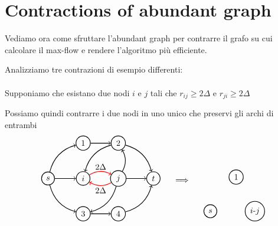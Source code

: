 \section{Contractions of abundant graph}
Vediamo ora come sfruttare l'abundant graph per contrarre il grafo su cui calcolare il max-flow e rendere l'algoritmo più efficiente.

Analizziamo tre contrazioni di esempio differenti:\\
\\
Supponiamo che esistano due nodi $i$ e $j$ tali che $r_{ij} \ge 2\Delta$ e $r_{ji} \ge 2\Delta$

Possiamo quindi contrarre i due nodi in uno unico che preservi gli archi di entrambi
\[\begin{tabular}{ccc}
    \begin{tikzpicture}[node distance={15mm}, thick , main/.style = {draw, circle}] 
    

    \node[main] (0) {$s$};
    \node[main] (3) [right of= 0 ] {$i$};
    \node[main] (4) [right of=3] {$j$};
    \node[main] (1) [below of = 3 ] {3};
    \node[main] (2) [above of = 3] {$1$};
    
    \node[main] (6) [above of=4] {$2$};
    \node[main] (5) [below of=4] {$4$};
    \node[main] (7) [right of=4] {$t$};
    \draw[->] (0) [bend right] to (1);
    \draw[->] (0) [bend left] to (2);
    \draw[->] (0) to (3);
    \draw[->] (3) [red, bend left] to (4);
    \node at (2.25,0.5) {$2\Delta$};
    \node at (2.25,-0.5) {$2\Delta$};
    \draw[->] (4) [red, bend left] to (3);
    
    \draw[->] (2) to (6);
    \draw[->] (4)[bend left] to (1);
    \draw[->] (4)[bend right] to (6);
    \draw[->] (6)[bend right] to (3);
    \draw[->] (4) to (7);
    \draw[->] (1) to (5);
    \draw[->] (6)[bend left] to (7);
    \draw[->] (5)[bend right] to (7);


\end{tikzpicture}&\begin{tikzpicture}
    \node {$\implies$};%
    \node at (0,1.4) {};
    \node at (0,-1.6) {};
\end{tikzpicture}  &
\begin{tikzpicture}[node distance={19mm}, thick , main/.style = {draw, circle}] 
    
    
    \node[main] (m)  {$i$-$j$};
    \node[main] (0) [left of = m ]{$s$};
    \node[main] (1) at (-0.8,1.45) {1};
    

\end{tikzpicture}
\end{tabular}\]
